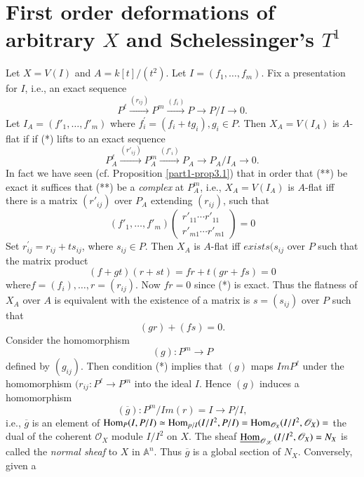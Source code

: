 {\section[First order deformations of arbitrary $X$...]{First order
deformations of arbitrary $X$ and Schelessinger's 
  $T^1$}\label{part1-sec6} 

Let $X=V(I)$ and $A=k[t]/(t^{2})$. Let $I=(f_1,\ldots,f_m)$. Fix a
presentation for $I$, i.e., an exact sequence 
\begin{equation*}
P^{\ell}\xrightarrow{(r_{ij})}P^{m}\xrightarrow{(f_i)}P\to P/I\to 0\tag{*}.
\end{equation*}
Let $I_A=(f'_1,\ldots,f'_m)$ where $f^{'}_i=(f_i+tg_i), g_i\in
P$. Then $X_A=V(I_A)$ is $A$-flat if if (*) lifts to an exact sequence 
\begin{equation*}
P^{\ell}_A\xrightarrow{(r'_{ij})}P^{m}_A\xrightarrow{(f'_i)}P_A\to P_A/I_A\to 0\tag{**}.
\end{equation*}
In fact we have seen (cf. Proposition \ref{part1-prop3.1}) that in
order that (**) be exact it suffices that (**) be a {\em complex} at
$P^{m}_A$, i.e., $X_A=V(I_A)$ is $A$-flat iff there is a matrix
$(r'_{ij})$ over $P_A$ extending $(r_{ij})$, such that 
$$
(f'_1,\ldots,f'_m)\begin{pmatrix}
r'_{11}\cdots r'_{11}\\
r'_{m1}\cdots r'_{m1}
\end{pmatrix}=0
$$
Set $r^{'}_{ij}=r_{ij}+ts_{ij}$, where $s_{ij}\in P$. Then $X_A$ is
$A$-flat iff $exists (s_{ij}$ over $P$ such that the matrix product 
$$
(f+gt)(r+st)=fr+t(gr+fs)=0
$$
where\pageoriginale $f=(f_i),\ldots,r=(r_{ij})$. Now $fr=0$ since (*)
is exact. Thus the flatness of $X_A$ over $A$ is equivalent with the
existence of  a matrix is $s=(s_{ij})$ over $P$ such that 
\begin{equation*}
(gr)+(fs)=0\tag{*}.
\end{equation*}
Consider the homomorphism
$$
(g):P^{m}\to P
$$
defined by $(g_{ij})$. Then condition (*) implies that $(g)$ maps $Im
P^{\ell}$ under the homomorphism $(r_{ij}:P^{\ell}\to P^{m}$ into the
ideal $I$. Hence $(g)$ induces a homomorphism 
$$
(\overline{g}):P^{m}/Im(r)=I\to P/I,
$$
i.e., $\overline{g}$ is an element of 
$\Hom_P(I,
 P/I)\simeq \Hom_{p/I}(I/I^{2},
 P/I)=\Hom_{\mathscr{O}_{X}}\break(I/I^{2}, \mathscr{O}_{X})=$ the dual of
 the coherent $\mathscr{O}_X$ module $I/I^{2}$ on $X$. The sheaf
 $\underline{\operatorname{Hom}}_{\mathscr{O_{X}}}(I/I^{2}, \mathscr{O}_X)=N_X$ 
 is called the {\em normal sheaf} to $X$ in $\mathbb{A}^{n}$. Thus
 $\overline{g}$ is a global section of $N_X$. Conversely, given a
}
